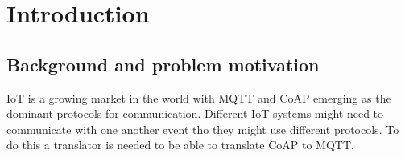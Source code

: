\section{Introduction}
\label{ch:intro}
\noindent




\subsection{Background and problem motivation}
\label{ch:intro:problem-motivation}

IoT is a growing market in the world with MQTT and CoAP emerging as the dominant protocols for communication. Different IoT systems might need to communicate with one another event tho they might use different protocols. To do this a translator is needed to be able to translate CoAP to MQTT. 



